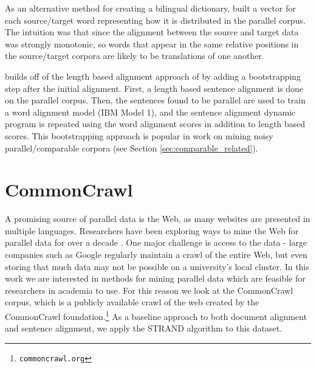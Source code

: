 As an alternative method for creating a bilingual dictionary, \citet{Fung94}
built a vector for each source/target word representing how it is distributed in
the parallel corpus. The intuition was that since the alignment between the
source and target data was strongly monotonic, so words that appear in the same
relative positions in the source/target corpora are likely to be translations of
one another.

\citet{Moore02} builds off of the length based alignment approach of
\citet{Gale93} by adding a bootstrapping step after the initial alignment.
First, a length based sentence alignment is done on the parallel corpus. Then,
the sentences found to be parallel are used to train a word alignment model
(IBM Model 1), and the sentence alignment dynamic program is repeated using
the word alignment scores in addition to length based scores. This bootstrapping
approach is popular in work on mining noisy parallel/comparable corpora (see
Section \ref{sec:comparable_related}).


\section{CommonCrawl}
A promising source of parallel data is the Web, as many websites are presented
in multiple languages. Researchers have been exploring ways to mine the Web for
parallel data for over a decade \citep{Resnik99,Nie99,Chen00}.
One major challenge is access to 
the data - large companies such as Google regularly maintain a crawl of the
entire Web, but even storing that much data may not be possible on a
university's local cluster.
In this work we are interested in methods for mining parallel data which are
feasible for researchers in academia to use.
For this reason we look at the CommonCrawl corpus,
which is a publicly available crawl of the web created by the CommonCrawl
foundation.\footnote{{\tt commoncrawl.org}}
As a baseline approach to both document alignment and sentence alignment, we
apply the STRAND algorithm \citep{Resnik03} to this dataset.

